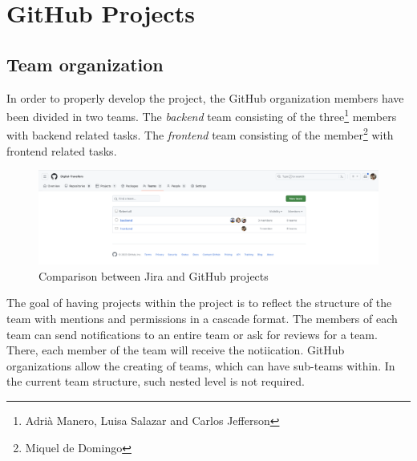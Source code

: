 \documentclass[../memory.tex]{subfiles}
\begin{document}
\section{GitHub Projects}
\subsection{Team organization}
In order to properly develop the project, the GitHub organization members have
been divided in two teams. The \emph{backend} team consisting of the
three\footnote{Adrià Manero, Luisa Salazar and Carlos Jefferson} members with
backend related tasks. The \emph{frontend} team consisting of the
member\footnote{Miquel de Domingo} with frontend related tasks.
\begin{figure}[H]
	\centering
	\includegraphics[width=\textwidth]{./assets/gh-teams.png}
	\caption{Comparison between Jira and GitHub projects}
\end{figure}
The goal of having projects within the project is to reflect the structure of
the team with mentions and permissions in a cascade format. The members of each
team can send notifications to an entire team or ask for reviews for a team.
There, each member of the team will receive the notiication. GitHub
organizations allow the creating of teams, which can have sub-teams within. In
the current team structure, such nested level is not required.
\end{document}
